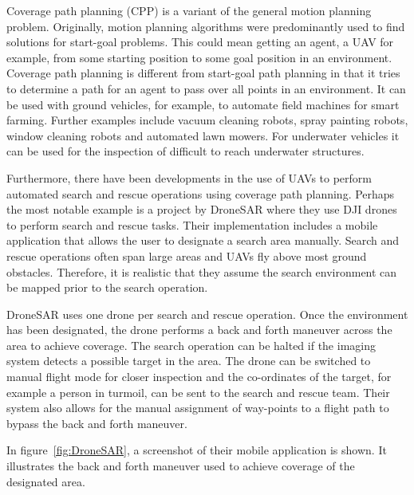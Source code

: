 Coverage path planning (CPP) is a variant of the general motion planning problem. Originally, motion planning algorithms were predominantly used to find solutions for start-goal problems\cite{Choset2001}. This could mean getting an agent, a UAV for example, from some starting position to some goal position in an environment\cite{Lynch2017}. Coverage path planning is different from start-goal path planning in that it tries to determine a path for an agent to pass over all points in an environment\cite{Choset2001}. It can be used with ground vehicles, for example, to automate field machines for smart farming\cite{Hameed2014}. Further examples include vacuum cleaning robots, spray painting robots\cite{Atkar2005}, window cleaning robots\cite{Mir-Nasiri2018} and automated lawn mowers\cite{Arkin1999}. For underwater vehicles it can be used for the inspection of difficult to reach underwater structures\cite{Englot2012}. 

Furthermore, there have been developments in the use of UAVs to perform automated search and rescue operations using coverage path planning. Perhaps the most notable example is a project by DroneSAR where they use DJI drones to perform search and rescue tasks. Their implementation includes a mobile application that allows the user to designate a search area manually\cite{DroneSAR01}. Search and rescue operations often span large areas and UAVs fly above most ground obstacles. Therefore, it is realistic that they assume the search environment can be mapped prior to the search operation\cite{CPP-Survey-2013}.

DroneSAR uses one drone per search and rescue operation. Once the environment has been designated, the drone performs a back and forth maneuver across the area to achieve coverage. The search operation can be halted if the imaging system detects a possible target in the area. The drone can be switched to manual flight mode for closer inspection and the co-ordinates of the target, for example a person in turmoil, can be sent to the search and rescue team. Their system also allows for the manual assignment of way-points to a flight path to bypass the back and forth maneuver.\cite{DroneSAR02}

In figure~\ref{fig:DroneSAR}, a screenshot of their mobile application is shown. It illustrates the back and forth maneuver used to achieve coverage of the designated area.

